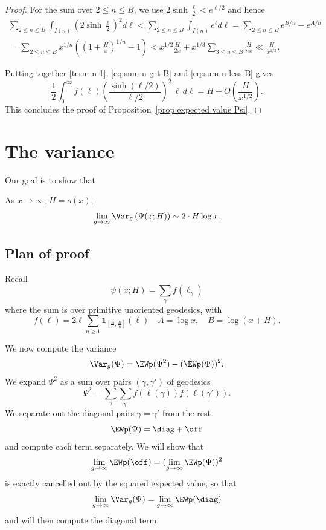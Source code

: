 \documentclass[12pt]{amsart}
\begin{document}
\begin{proof}
For the sum over $2\leq n\leq B$, we use $2\sinh \frac \ell 2<e^{\ell/2}$ and hence
\begin{multline}\label{eq:sum n less B} 
\sum_{2\leq n\leq B} \int_{I(n)}  \left(2\sinh \frac \ell 2\right)^2  d\ell < \sum_{2\leq n\leq B} \int_{I(n)} e^\ell d\ell =\sum_{2\leq n\leq B} e^{B/n}-e^{A/n}
\\
=\sum_{2\leq n\leq B} x^{1/n}\left( (1+\frac Hx)^{1/n}-1 \right)
< x^{1/2} \frac{H}{2x}+x^{1/3}  \sum_{3\leq n\leq B}  \frac{H}{nx}\ll \frac{H}{x^{1/2}}.
\end{multline}

Putting together \eqref{term n 1}, \eqref{eq:sum n grt B} and \eqref{eq:sum n less B} gives
\[
\frac 12    \int_0^\infty f(\ell) \left( \frac {\sinh(\ell/2)}{\ell/2} \right)^2 \, \ell \,d\ell  = 
 H+ O\left(\frac{H}{x^{1/2}}\right). 
\]
 This concludes the proof of  Proposition~\ref{prop:expected value Psi}.  
\end{proof}

 
 



 

\section{The variance}

Our goal is to show that 
\begin{thm} \label{thm:variance psi}
As $x\to \infty$, $H=o(x)$,
\[
\lim_{g\to \infty} \Var_g\left( \Psi(x;H) \right) \sim 2 \cdot H \log x .
\] 
\end{thm}


\subsection{Plan of proof}

Recall 
\[
\psi(x;H) =  \sum_{\gamma} f(\ell_\gamma)
\]
where the sum is over  primitive unoriented geodesics, with 
\begin{equation*}%
f(\ell) = 2\ell \sum_{n\geq 1} \mathbf 1_{[\frac An, \frac Bn]}(\ell)  
\quad 
A=\log x, \quad B=\log(x+H) .
\end{equation*}
 

We now compute the variance 
\[
\Var_g(\Psi ) = \EWp( \Psi^2 ) - (\EWp(\Psi))^2 .
\]
We expand $\Psi^2$ as a sum over pairs $(\gamma,\gamma')$ of  geodesics
\[
 \Psi^2 =  \sum_\gamma \sum_{\gamma'}  f(\ell(\gamma)) f(\ell(\gamma')).
\]
We separate out the diagonal pairs $\gamma=\gamma'$ from the rest 
\[
\EWp(\Psi) = \diag + \off 
\] 
and compute each term separately. We will show that  
$$\lim_{g\to \infty} \EWp(\off)=(\lim_{g\to \infty}\EWp(\Psi))^2$$ 
is exactly cancelled out by the squared expected value, so that 
\[
\lim_{g\to \infty} \Var_g(\Psi) = \lim_{g\to \infty} \EWp(\diag)
\]
and will then compute the diagonal term. 
\end{document}
